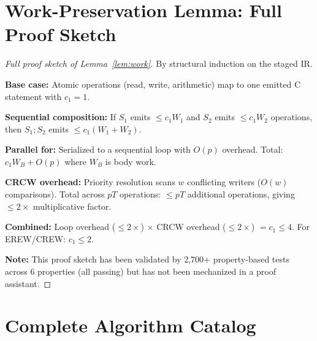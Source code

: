 \documentclass[11pt]{article}
\begin{document}
\section{Work-Preservation Lemma: Full Proof Sketch}
\label{app:work}

\begin{proof}[Full proof sketch of Lemma~\ref{lem:work}]
By structural induction on the staged IR\@.

\textbf{Base case:} Atomic operations (read, write, arithmetic) map to
one emitted C statement with $c_1 = 1$.

\textbf{Sequential composition:} If $S_1$ emits $\le c_1 W_1$ and $S_2$
emits $\le c_1 W_2$ operations, then $S_1; S_2$ emits $\le c_1(W_1 + W_2)$.

\textbf{Parallel for:} Serialized to a sequential loop with $O(p)$
overhead.  Total: $c_1 W_B + O(p)$ where $W_B$ is body work.

\textbf{CRCW overhead:} Priority resolution scans $w$ conflicting writers
($O(w)$ comparisons).  Total across $pT$ operations: $\le pT$ additional
operations, giving $\le 2\times$ multiplicative factor.

\textbf{Combined:} Loop overhead ($\le 2\times$) $\times$ CRCW overhead
($\le 2\times$) $= c_1 \le 4$.  For EREW/CREW: $c_1 \le 2$.

\smallskip\noindent\textbf{Note:} This proof sketch has been validated by
2,700+ property-based tests across 6 properties (all passing) but has not
been mechanized in a proof assistant.
\end{proof}

\section{Complete Algorithm Catalog}
\label{app:catalog}
\end{document}
